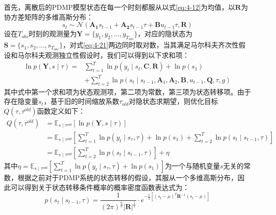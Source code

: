 首先，离散后的PDMP模型状态在每一个时刻都服从以式\ref{eq:4-12}为均值，以$\mathbf{R}$为协方差矩阵的多维高斯分布：
\begin{equation}
  s_t \sim \mathcal N(\mathbf{A_1}s_{t-1}+\mathbf{A_2}s_{t-1}\tau+\mathbf{B}u_{t-1}\tau,\mathbf{R})
  \label{eq:4-23}
\end{equation}
设在$T_{obs}$时刻的观测量为$\mathbf{Y}=\{y_1,y_2,...,y_{T_{obs}}\}$，对应的隐状态为$\mathbf S = \{s_1,s_2,...,s_{T_{obs}}\}$，对式\ref{eq:4-21}两边同时取对数，当其满足马尔科夫齐次性假设和马尔科夫观测独立性假设时，我们可以得到以下求和项：
\begin{equation}
    \begin{aligned}
    \ln p(\mathbf{Y}, s \mid \tau)= & \sum_{t=1}^T \ln p\left(y_t \mid s_t, \mathbf{C}, \mathbf{R}\right)+\ln p\left(s_1\right) \\
    & +\sum_{t=2}^T \ln p\left(s_t \mid s_{t-1}, \mathbf{A}_1, \mathbf{A}_2, \mathbf{B}, u_{t-1}, \mathbf{Q}, \tau, g\right)
    \end{aligned}
\end{equation}
其中式中第一个求和项为状态观测项，第二项为常数，第三项为状态转移项。由于存在隐变量$s_t$，基于旧的时间缩放系数$\tau_{old}$对隐状态求期望，则优化目标$ Q\left(\tau, \tau^{old}\right)$函数定义如下：
\begin{equation}
\begin{aligned}
    Q\left(\tau, \tau^{old}\right)
    &=\mathbb{E}_{s \mid \tau^{old}}\left[\ln p(\mathbf{Y}, s \mid \tau)\right]\\
    & =\mathbb{E}_{s \mid \tau^{old}}\left[\sum_{t=1}^T \ln p\left(y_t \mid s_\tau, \tau\right)+\ln p\left(s_1\right)+\sum_{t=2}^T \ln p\left(s_t \mid s_{t-1}, \tau\right)\right] \\
    & =\mathbb{E}_{s \mid \tau^{old}}\left[\sum_{t=2}^T \ln p\left(s_t \mid s_{t-1}, \tau\right)\right] + \eta 
\end{aligned}
\end{equation}
其中$\eta=\mathbb{E}_{s \mid \tau^{old}} \left[\sum_{t=1}^T \ln p\left(y_t \mid s_\tau, \tau\right) + \ln p\left(s_1\right)\right]$为一个与随机变量$s$无关的常数，根据之前对于PDMP系统的状态转移的假设，其服从一个多维高斯分布，因此可以得到关于状态转移条件概率的概率密度函数表达式为：
\begin{equation}
    p\left(s_t \mid s_{t-1}, \tau\right)=\frac{1}{(2 \pi)^{\frac{n}{2}}|\mathbf{R}|^{\frac{1}{2}}} \cdot e^{-\frac{1}{2}\left[\left(s_t-\mu\right)^T \mathbf{R}^{-1}\left(s_t-\mu\right)\right]}
\end{equation}
